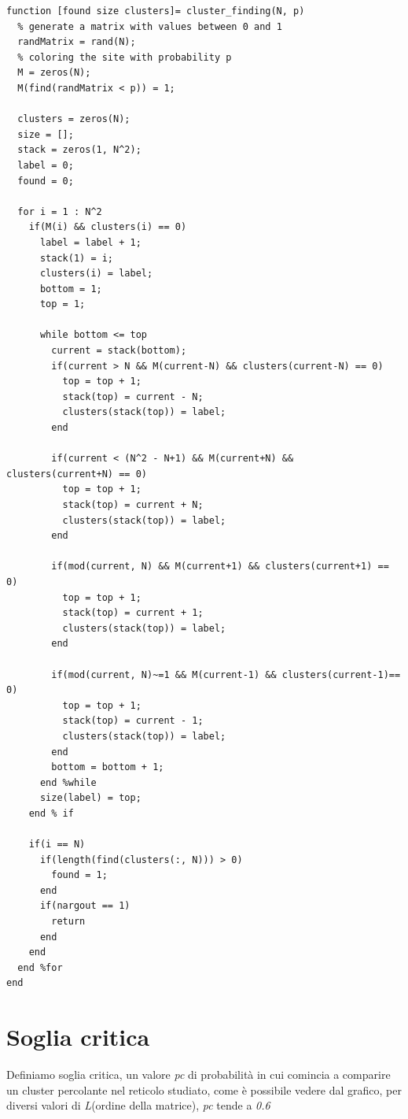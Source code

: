 \documentclass[10pt,a4paper]{article}
\begin{document}
\begin{lstlisting}[caption={cluster\_finding.m},label=useless]
function [found size clusters]= cluster_finding(N, p)
  % generate a matrix with values between 0 and 1
  randMatrix = rand(N);
  % coloring the site with probability p
  M = zeros(N);
  M(find(randMatrix < p)) = 1;
    
  clusters = zeros(N);
  size = [];
  stack = zeros(1, N^2);
  label = 0;
  found = 0;
    
  for i = 1 : N^2
    if(M(i) && clusters(i) == 0)
      label = label + 1;
      stack(1) = i;
      clusters(i) = label;
      bottom = 1;
      top = 1;
            
      while bottom <= top
        current = stack(bottom);
        if(current > N && M(current-N) && clusters(current-N) == 0)
          top = top + 1;
          stack(top) = current - N;
          clusters(stack(top)) = label;
        end
                
        if(current < (N^2 - N+1) && M(current+N) && clusters(current+N) == 0)
          top = top + 1;
          stack(top) = current + N;
          clusters(stack(top)) = label;
        end
                
        if(mod(current, N) && M(current+1) && clusters(current+1) == 0)
          top = top + 1;
          stack(top) = current + 1;
          clusters(stack(top)) = label;
        end
                
        if(mod(current, N)~=1 && M(current-1) && clusters(current-1)== 0)
          top = top + 1;
          stack(top) = current - 1;
          clusters(stack(top)) = label;
        end
        bottom = bottom + 1;
      end %while 
      size(label) = top;
    end % if 
        
    if(i == N)
      if(length(find(clusters(:, N))) > 0)
        found = 1;
      end
      if(nargout == 1)
        return
      end
    end
  end %for
end
\end{lstlisting}

\section{Soglia critica}
Definiamo soglia critica, un valore \emph{pc} di probabilità in cui comincia a comparire un cluster percolante nel reticolo studiato, come è possibile vedere dal grafico, per diversi valori di \emph{L}(ordine della matrice),  \emph{pc} tende a \emph{0.6}\\
\end{document}
